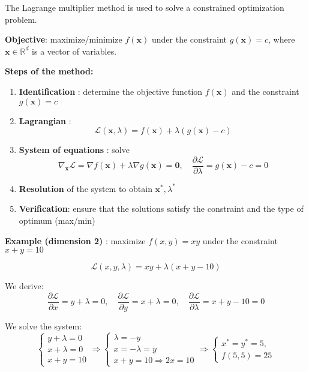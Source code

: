 \begin{f}
	
	The Lagrange multiplier method is used to solve a constrained optimization problem.
	
	\textbf{Objective}: maximize/minimize \(f(\boldsymbol{x})\) under the constraint \(g(\boldsymbol{x}) = c\), where \(\boldsymbol{x} \in \mathbb{R}^d\) is a vector of variables.
	
	\textbf{Steps of the method:}
	\begin{enumerate}
		\item \textbf{Identification} : determine the objective function \(f(\boldsymbol{x})\) and the constraint \(g(\boldsymbol{x}) = c\)
		\item \textbf{Lagrangian} :
		\[
		\mathcal{L}(\boldsymbol{x}, \lambda) = f(\boldsymbol{x}) + \lambda (g(\boldsymbol{x}) - c)
		\]
		\item \textbf{System of equations} : solve
		\[
		\nabla_{\boldsymbol{x}} \mathcal{L} = \nabla f(\boldsymbol{x}) + \lambda \nabla g(\boldsymbol{x}) = \boldsymbol{0}, \quad
		\frac{\partial \mathcal{L}}{\partial \lambda} = g(\boldsymbol{x}) - c = 0
		\]
		\item \textbf{Resolution} of the system to obtain \(\boldsymbol{x}^*, \lambda^*\)
		\item \textbf{Verification}: ensure that the solutions satisfy the constraint and the type of optimum (max/min)
	\end{enumerate}
	
	\textbf{Example (dimension 2)} : maximize \(f(x, y) = xy\) under the constraint \(x + y = 10\)
	
	\[
	\mathcal{L}(x, y, \lambda) = xy + \lambda (x + y - 10)
	\]
	
	We derive:
	\[
	\frac{\partial \mathcal{L}}{\partial x} = y + \lambda = 0, \quad
	\frac{\partial \mathcal{L}}{\partial y} = x + \lambda = 0, \quad
	\frac{\partial \mathcal{L}}{\partial \lambda} = x + y - 10 = 0
	\]
	
	We solve the system:
\[
\begin{cases}
	y + \lambda = 0 \\
	x + \lambda = 0 \\
	x + y = 10
\end{cases}
\Rightarrow 
\begin{cases}
	\lambda = -y \\
	x = -\lambda = y \\
	x + y = 10 \Rightarrow 2x = 10 
\end{cases}
\Rightarrow 
	\begin{cases} 
		x^* =  y^*= 5,\\
		f(5,5) = 25
	\end{cases}
\]


\end{f}
